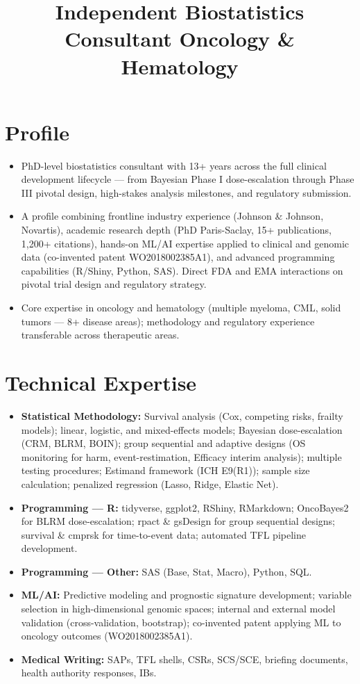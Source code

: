 \documentclass[11pt,a4paper]{moderncv}
\title{Independent Biostatistics Consultant \textbar{} Oncology \& Hematology}
\begin{document}
\makecvtitle

\section{Profile}

\begin{itemize}
  \item PhD-level biostatistics consultant with 13+ years across the full clinical development lifecycle --- from Bayesian Phase I dose-escalation through Phase III pivotal design, high-stakes analysis milestones, and regulatory submission.
  \item A profile combining frontline industry experience (Johnson \& Johnson, Novartis), academic research depth (PhD Paris-Saclay, 15+ publications, 1,200+ citations), hands-on ML/AI expertise applied to clinical and genomic data (co-invented patent WO2018002385A1), and advanced programming capabilities (R/Shiny, Python, SAS). Direct FDA and EMA interactions on pivotal trial design and regulatory strategy.
  \item Core expertise in oncology and hematology (multiple myeloma, CML, solid tumors --- 8+ disease areas); methodology and regulatory experience transferable across therapeutic areas.
\end{itemize}

\section{Technical Expertise}

\begin{itemize}
  \item \textbf{Statistical Methodology:} Survival analysis (Cox, competing risks, frailty models); linear, logistic, and mixed-effects models; Bayesian dose-escalation (CRM, BLRM, BOIN); group sequential and adaptive designs (OS monitoring for harm, event-restimation, Efficacy interim analysis); multiple testing procedures; Estimand framework (ICH E9(R1)); sample size calculation; penalized regression (Lasso, Ridge, Elastic Net).
  \item \textbf{Programming --- R:} tidyverse, ggplot2, RShiny, RMarkdown; OncoBayes2 for BLRM dose-escalation; rpact \& gsDesign for group sequential designs; survival \& cmprsk for time-to-event data; automated TFL pipeline development.
  \item \textbf{Programming --- Other:} SAS (Base, Stat, Macro), Python, SQL.
  \item \textbf{ML/AI:} Predictive modeling and prognostic signature development; variable selection in high-dimensional genomic spaces; internal and external model validation (cross-validation, bootstrap); co-invented patent applying ML to oncology outcomes (WO2018002385A1).
  \item \textbf{Medical Writing:} SAPs, TFL shells, CSRs, SCS/SCE, briefing documents, health authority responses, IBs.
\end{itemize}
\end{document}
